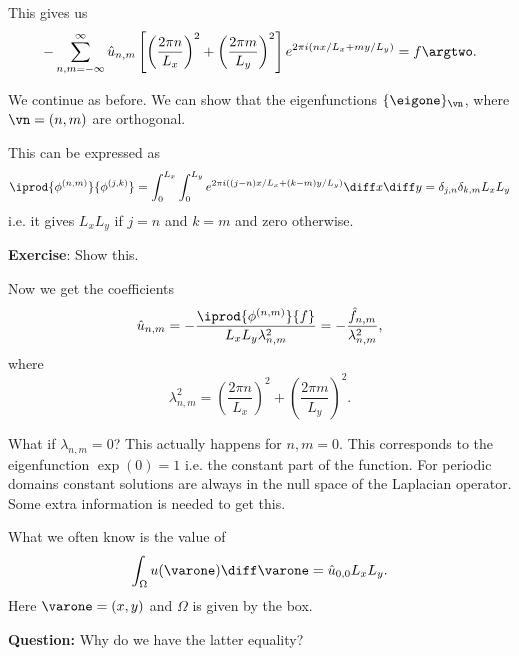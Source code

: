 \begin{frame}
	This gives us 
	\begin{equation}\label{eq:Poisson_solution}
		-\sum_{n,m=-\infty}^{\infty} \hat{u}_{n,m} \left[
		\left(\frac{2\pi n}{L_x} \right)^2 + \left(\frac{2\pi m}{L_y}\right)^2 
		\right]
		e^{2\pi i (nx/L_x+my/L_y) } = f\argtwo . 	
	\end{equation}
	
	\pause
	We continue as before. We can show that the eigenfunctions $ \{ \eigone \}_\vn $, where $ \vn = (n,m) $ are orthogonal. 
	
	\pause
	This can be expressed as 
	\[  
	\iprod{\phi^{(n,m)}}{\phi^{(j,k)}} = \int_0^{L_x} \int_{0}^{L_y} e^{2\pi i ((j-n)x/L_x + (k-m)y/L_y)} \diff x \diff y = \delta_{j,n} \delta_{k,m} L_x L_y
	\] 
	i.e. it gives $ L_x L_y $ if $ j=n $ and $ k=m $ and zero otherwise. 
	
	\pause 
	\textbf{Exercise}: Show this.
\end{frame}

\begin{frame}
	Now we get the coefficients 
	\[  
	\hat{u}_{n,m} = -\frac{\iprod{\phi^{(n,m)}}{f}}{ L_x L_y \lambda_{n,m}^2} 
	= -\frac{\hat{f}_{n,m}}{  \lambda_{n,m}^2},
	\]
	where 
	$$ 
	\lambda_{n,m}^2 = \left(\frac{2\pi n}{L_x} \right)^2 + \left(\frac{2\pi m}{L_y} \right)^2. 
	$$
	
	\pause
	What if $ \lambda_{n,m} = 0 $? This actually happens for $ n,m=0 $. This corresponds to the eigenfunction $ \exp(0) = 1 $ i.e. the constant part of the function. For periodic domains constant solutions are always in the null space of the Laplacian operator. Some extra information is needed to get this. 
	
	\pause
	What we often know is the value of 
	\[ \int_{\Omega} u (\varone) \diff \varone = \hat{u}_{0,0}L_x L_y. \]
	Here $ \varone = (x,y) $ and $ \Omega $ is given by the box.
	
	\pause
	\textbf{Question:} Why do we have the latter equality?
	
\end{frame}

